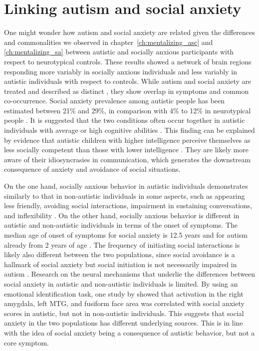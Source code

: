 \section{Linking autism and social anxiety}

One might wonder how autism and social anxiety are related given the differences and commonalities we observed in chapter~\ref{ch:mentalizing_asc} and \ref{ch:mentalizing_sa} between autistic and socially anxious participants with respect to neurotypical controls. These results showed a network of brain regions responding more variably in socially anxious individuals and less variably in autistic individuals with respect to controls. While autism and social anxiety are treated and described as distinct \citep{apa2013}, they show overlap in symptoms and common co-occurrence. Social anxiety prevalence among autistic people has been estimated between 21\% and 29\%, in comparison with 4\% to 12\% in neurotypical people \citep{muris1998,simonoff2008,kessler2005,stein2017}. It is suggested that the two conditions often occur together in autistic individuals with average or high cognitive abilities \citep{bellini2004,kuusikko2008}. This finding can be explained by evidence that autistic children with higher intelligence perceive themselves as less socially competent than those with lower intelligence \citep{capps1995}. They are likely more aware of their idiosyncrasies in communication, which generates the downstream consequence of anxiety and avoidance of social situations.

On the one hand, socially anxious behavior in autistic individuals demonstrates similarly to that in non-autistic individuals in some aspects, such as appearing less friendly, avoiding social interactions, impairment in sustaining conversations, and inflexibility \citep{white2011socialanxiety}. On the other hand, socially anxious behavior is different in autistic and non-autistic individuals in terms of the onset of symptoms. The median age of onset of symptoms for social anxiety is 12.5 years and for autism already from 2 years of age \citep{dewit1999,ozonoff2008}. The frequency of initiating social interactions is likely also different between the two populations, since social avoidance is a hallmark of social anxiety but social initiation is not necessarily impaired in autism \citep{white2011socialanxiety,humphrey2011}. Research on the neural mechanisms that underlie the differences between social anxiety in autistic and non-autistic individuals is limited. By using an emotional identification task, one study by \cite{kleinhans2010} showed that activation in the right amygdala, left MTG, and fusiform face area was correlated with social anxiety scores in autistic, but not in non-autistic individuals. This suggests that social anxiety in the two populations has different underlying sources. This is in line with the idea of social anxiety being a consequence of autistic behavior, but not a core symptom.

